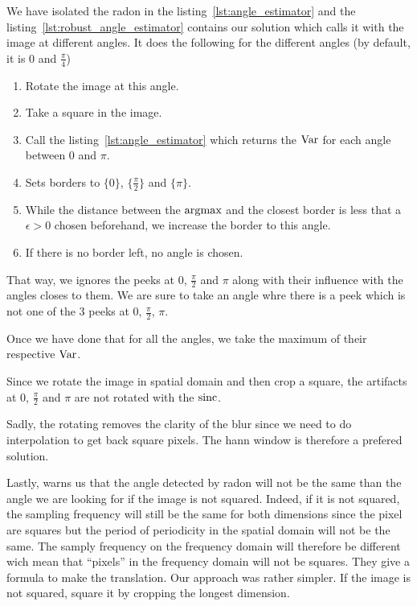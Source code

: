 We have isolated the radon in
the listing~\ref{lst:angle_estimator} and
the listing~\ref{lst:robust_angle_estimator} contains
our solution which calls it with the image at different
angles.
It does the following for the different angles
(by default, it is 0 and $\frac{\pi}{4}$)
\begin{enumerate}
  \item Rotate the image at this angle.
  \item Take a square in the image.
  \item Call the listing~\ref{lst:angle_estimator} which
    returns the $\operatorname{Var}$ for each angle between 0 and $\pi$.
  \item Sets borders to $\{0\}$, $\{\frac{\pi}{2}\}$
    and $\{\pi\}$.
  \item While the distance between the $\operatorname{argmax}$ and the
    closest border is less that a $\epsilon > 0$ chosen
    beforehand, we increase the border to this angle.
  \item If there is no border left, no angle is chosen.
\end{enumerate}
That way, we ignores the peeks at $0$, $\frac{\pi}{2}$
and $\pi$ along with their influence with the angles
closes to them.
We are sure to take an angle whre there is a peek
which is not one of the 3 peeks at 0, $\frac{\pi}{2}$, $\pi$.

Once we have done that for all the angles,
we take the maximum of their respective $\operatorname{Var}$.

Since we rotate the image in spatial domain and then crop
a square, the artifacts at 0, $\frac{\pi}{2}$ and $\pi$ are
not rotated with the $\operatorname{sinc}$.

Sadly, the rotating removes the clarity of the blur since
we need to do interpolation to get back square pixels.
The hann window is therefore a prefered solution.

Lastly, \cite{krahmer2006blind} warns us that the angle
detected by radon will not be the same than the angle
we are looking for if the image is not squared.
Indeed, if it is not squared, the sampling frequency
will still be the same for both dimensions since
the pixel are squares but the period of periodicity
in the spatial domain will not be the same.
The samply frequency on the frequency domain will therefore
be different wich mean that ``pixels'' in the frequency
domain will not be squares.
They give a formula to make the translation.
Our approach was rather simpler.
If the image is not squared, square it by cropping the
longest dimension.

